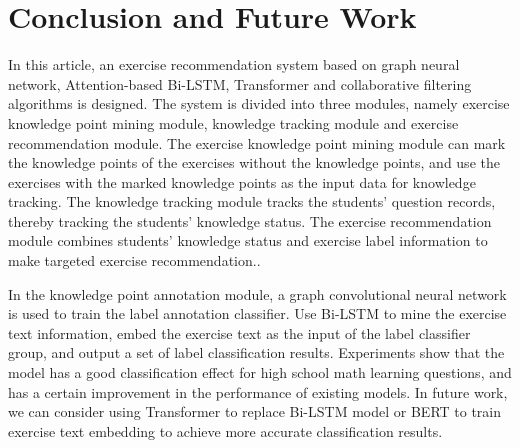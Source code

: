 \chapter{Conclusion and Future Work}


In this article, an exercise recommendation system based on graph neural network, Attention-based Bi-LSTM, Transformer and collaborative filtering algorithms is designed. The system is divided into three modules, namely exercise knowledge point mining module, knowledge tracking module and exercise recommendation module. The exercise knowledge point mining module can mark the knowledge points of the exercises without the knowledge points, and use the exercises with the marked knowledge points as the input data for knowledge tracking. The knowledge tracking module tracks the students' question records, thereby tracking the students' knowledge status. The exercise recommendation module combines students' knowledge status and exercise label information to make targeted exercise recommendation..


In the knowledge point annotation module, a graph convolutional neural network is used to train the label annotation classifier. Use Bi-LSTM to mine the exercise text information, embed the exercise text as the input of the label classifier group, and output a set of label classification results. Experiments show that the model has a good classification effect for high school math learning questions, and has a certain improvement in the performance of existing models. In future work, we can consider using Transformer to replace Bi-LSTM model or BERT to train exercise text embedding to achieve more accurate classification results.

